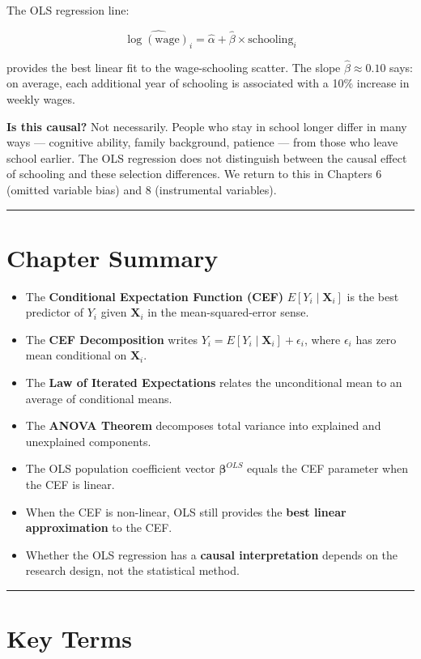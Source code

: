 The OLS regression line:

\[
\widehat{\log(\text{wage})_i} = \hat{\alpha} + \hat{\beta} \times \text{schooling}_i
\]

provides the best linear fit to the wage-schooling scatter. The slope $\hat{\beta} \approx 0.10$ says: on average, each additional year of schooling is associated with a 10\% increase in weekly wages.

\textbf{Is this causal?} Not necessarily. People who stay in school longer differ in many ways --- cognitive ability, family background, patience --- from those who leave school earlier. The OLS regression does not distinguish between the causal effect of schooling and these selection differences. We return to this in Chapters 6 (omitted variable bias) and 8 (instrumental variables).

\medskip\hrule\medskip

\section{Chapter Summary}

\begin{itemize}
\item The \textbf{Conditional Expectation Function (CEF)} $E[Y_i \mid \mathbf{X}_i]$ is the best predictor of $Y_i$ given $\mathbf{X}_i$ in the mean-squared-error sense.
\item The \textbf{CEF Decomposition} writes $Y_i = E[Y_i \mid \mathbf{X}_i] + \epsilon_i$, where $\epsilon_i$ has zero mean conditional on $\mathbf{X}_i$.
\item The \textbf{Law of Iterated Expectations} relates the unconditional mean to an average of conditional means.
\item The \textbf{ANOVA Theorem} decomposes total variance into explained and unexplained components.
\item The OLS population coefficient vector $\boldsymbol{\beta}^{OLS}$ equals the CEF parameter when the CEF is linear.
\item When the CEF is non-linear, OLS still provides the \textbf{best linear approximation} to the CEF.
\item Whether the OLS regression has a \textbf{causal interpretation} depends on the research design, not the statistical method.
\end{itemize}

\medskip\hrule\medskip

\section{Key Terms}

